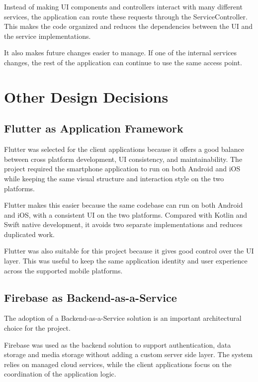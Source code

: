 Instead of making UI components and controllers interact with many different services, the application can route these requests through the ServiceController. This makes the code organized and reduces the dependencies between the UI and the service implementations.

It also makes future changes easier to manage. If one of the internal services changes, the rest of the application can continue to use the same access point. 

\section{Other Design Decisions} \label{Other Design Decisions}

\subsection{Flutter as Application Framework} \label{Flutter as Application Framework}

Flutter was selected for the client applications because it offers a good balance between cross platform development, UI consistency, and maintainability. The project required the smartphone application to run on both Android and iOS while keeping the same visual structure and interaction style on the two platforms.

Flutter makes this easier because the same codebase can run on both Android and iOS, with a consistent UI on the two platforms. Compared with Kotlin and Swift native development, it avoids two separate implementations and reduces duplicated work.

Flutter was also suitable for this project because it gives good control over the UI layer. This was useful to keep the same application identity and user experience across the supported mobile platforms.

\subsection{Firebase as Backend-as-a-Service} \label{Firebase as Backend-as-a-Service}
The adoption of a Backend-as-a-Service solution is an important architectural choice for the project. \

Firebase was used as the backend solution to support authentication, data storage and media storage without adding a custom server side layer. The system relies on managed cloud services, while the client applications focus on the coordination of the application logic.

